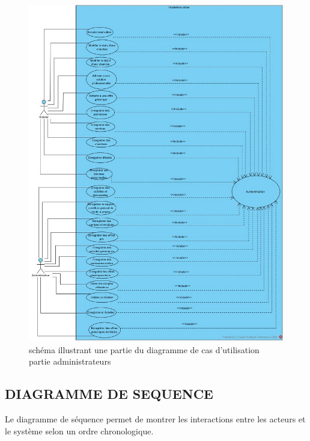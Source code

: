 \cleardoublepage
\begin{figure}[h]
	\begin{center}
		\includegraphics[scale=0.75]{images/diag_use_case2.jpg}
		\caption{schéma illustrant une partie du diagramme de cas d’utilisation partie administrateurs}
		\label{synthese-cout-salarieu}
	\end{center}
\end{figure}

\cleardoublepage
\subsection{DIAGRAMME DE SEQUENCE}
Le diagramme de séquence permet de montrer les interactions entre les acteurs et le système selon un ordre chronologique.

